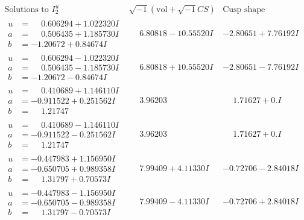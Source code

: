 \documentclass[1p]{elsarticle_modified}
\theoremstyle{definition}
\newcommand{\I}{\sqrt{-1}}
\begin{document}
$$\begin{array}{c|c|c}  
\text{Solutions to }I^u_{2}& \I (\text{vol} + \sqrt{-1}CS) & \text{Cusp shape}\\
 \hline 
\begin{aligned}
u &= \phantom{-}0.606294 + 1.022320 I \\
a &= \phantom{-}0.506435 + 1.185730 I \\
b &= -1.20672 + 0.84674 I\end{aligned}
 & \phantom{-}6.80818 - 10.55520 I & -2.80651 + 7.76192 I \\ \hline\begin{aligned}
u &= \phantom{-}0.606294 - 1.022320 I \\
a &= \phantom{-}0.506435 - 1.185730 I \\
b &= -1.20672 - 0.84674 I\end{aligned}
 & \phantom{-}6.80818 + 10.55520 I & -2.80651 - 7.76192 I \\ \hline\begin{aligned}
u &= \phantom{-}0.410689 + 1.146110 I \\
a &= -0.911522 + 0.251562 I \\
b &= \phantom{-}1.21747\phantom{ +0.000000I}\end{aligned}
 & \phantom{-}3.96203\phantom{ +0.000000I} & \phantom{-}1.71627 + 0. I\phantom{ +0.000000I} \\ \hline\begin{aligned}
u &= \phantom{-}0.410689 - 1.146110 I \\
a &= -0.911522 - 0.251562 I \\
b &= \phantom{-}1.21747\phantom{ +0.000000I}\end{aligned}
 & \phantom{-}3.96203\phantom{ +0.000000I} & \phantom{-}1.71627 + 0. I\phantom{ +0.000000I} \\ \hline\begin{aligned}
u &= -0.447983 + 1.156950 I \\
a &= -0.650705 + 0.989358 I \\
b &= \phantom{-}1.31797 + 0.70573 I\end{aligned}
 & \phantom{-}7.99409 + 4.11330 I & -0.72706 - 2.84018 I \\ \hline\begin{aligned}
u &= -0.447983 - 1.156950 I \\
a &= -0.650705 - 0.989358 I \\
b &= \phantom{-}1.31797 - 0.70573 I\end{aligned}
 & \phantom{-}7.99409 - 4.11330 I & -0.72706 + 2.84018 I \\ \hline\begin{aligned}

\end{aligned}
\end{array}$$
\end{document}
